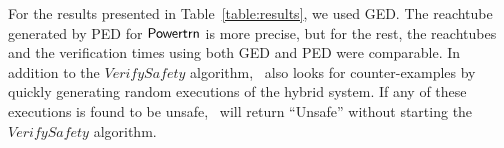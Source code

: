 %
 For the results presented in Table~\ref{table:results}, we used GED. The reachtube generated by PED for ${\operatorname{\mathsf{Powertrn}}}$ is more precise, but for the rest, the reachtubes and the verification times using both GED and PED were comparable.  
%
%
%
%
%
%
%
In addition to the $\mathit{VerifySafety}$ algorithm, \toolname\ also
looks for counter-examples by quickly generating random executions of
the hybrid system.  If any of these executions is found to be unsafe,
\toolname\ will return ``Unsafe'' without starting the
$\mathit{VerifySafety}$ algorithm.

%
%
